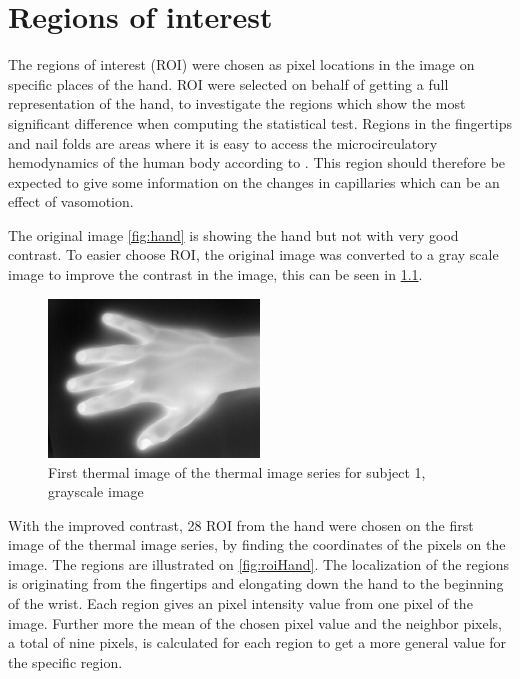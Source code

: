 \chapter{Regions of interest}

The regions of interest (ROI) were chosen as pixel locations in the image on specific places of the hand. ROI were selected on behalf of getting a full representation of the hand, to investigate the regions which show the most significant difference when computing the statistical test. 
Regions in the fingertips and nail folds are areas where it is easy to access the microcirculatory hemodynamics of the human body according to \cite{Iabichella2006}. This region should therefore be expected to give some information on the changes in capillaries which can be an effect of vasomotion. 

The original image \ref{fig:hand} is showing the hand but not with very good contrast. To easier choose ROI, the original image was converted to a gray scale image to improve the contrast in the image, this can be seen in \ref{fig:mat2grayHand}. 

\begin{figure}[H]
	\includegraphics[width=0.5\textwidth]{figures/mat2grayHand}  %
	\caption{First thermal image of the thermal image series for subject 1, grayscale image}
	\label{fig:mat2grayHand}  %
\end{figure}

With the improved contrast, 28 ROI from the hand were chosen on the first image of the thermal image series, by finding the coordinates of the pixels on the image. The regions are illustrated on \ref{fig:roiHand}. The localization of the regions is originating from the fingertips and elongating down the hand to the beginning of the wrist. Each region gives an pixel intensity value from one pixel of the image. Further more the mean of the chosen pixel value and the neighbor pixels, a total  of nine pixels, is calculated for each region to get a more general value for the specific region.

